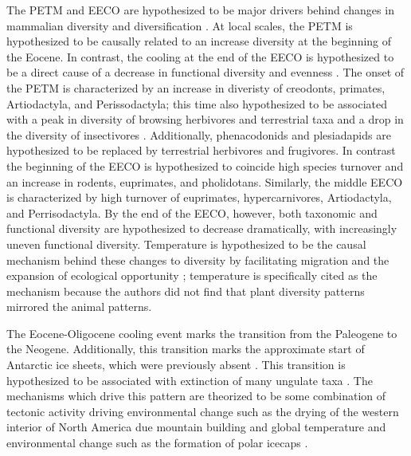 \documentclass[12pt,letterpaper]{article}
\begin{document}
The PETM and EECO are hypothesized to be major drivers behind changes in mammalian diversity and diversification \citep{Clyde1998a,Woodburne2009}. At local scales, the PETM is hypothesized to be causally related to an increase diversity at the beginning of the Eocene. In contrast, the cooling at the end of the EECO is hypothesized to be a direct cause of a decrease in functional diversity and evenness \citep{Woodburne2009}. The onset of the PETM is characterized by an increase in diveristy of creodonts, primates, Artiodactyla, and Perissodactyla; this time also hypothesized to be associated with a peak in diversity of browsing herbivores and terrestrial taxa and a drop in the diversity of insectivores \citep{Woodburne2009}. Additionally, phenacodonids and plesiadapids are hypothesized to be replaced by terrestrial herbivores and frugivores. In contrast the beginning of the EECO is hypothesized to coincide high species turnover and an increase in rodents, euprimates, and pholidotans. Similarly, the middle EECO is characterized by high turnover of euprimates, hypercarnivores, Artiodactyla, and Perrisodactyla. By the end of the EECO, however, both taxonomic and functional diversity are hypothesized to decrease dramatically, with increasingly uneven functional diversity. Temperature is hypothesized to be the causal mechanism behind these changes to diversity by facilitating migration and the expansion of ecological opportunity \citep{Woodburne2009}; temperature is specifically cited as the mechanism because the authors did not find that plant diversity patterns mirrored the animal patterns.

The Eocene-Oligocene cooling event marks the transition from the Paleogene to the Neogene. Additionally, this transition marks the approximate start of Antarctic ice sheets, which were previously absent \citep{Zachos2008}. This transition is hypothesized to be associated with extinction of many ungulate taxa \citep{Janis2008a}. The mechanisms which drive this pattern are theorized to be some combination of tectonic activity driving environmental change such as the drying of the western interior of North America due mountain building and global temperature and environmental change such as the formation of polar icecaps \citep{Janis2008a,Eronen2015,Blois2009,Badgley2017}. 
\end{document}
